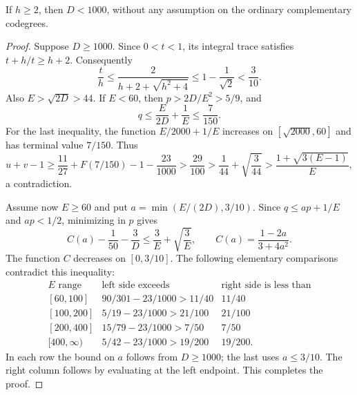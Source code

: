 \begin{lemma}\label{quad:opt:norm-ratio}
If $h\ge2$, then $D<1000$, without any assumption on the ordinary
complementary codegrees.
\end{lemma}
\begin{proof}
Suppose $D\ge1000$. Since $0<t<1$, its integral trace satisfies
$t+h/t\ge h+2$. Consequently
\[
 \frac th\le\frac2{h+2+\sqrt{h^2+4}}
 \le1-\frac1{\sqrt2}<\frac3{10}.
\]
Also $E>\sqrt{2D}>44$. If $E<60$, then
$p>2D/E^2>5/9$, and
\[
 q\le\frac E{2D}+\frac1E\le\frac7{150}.
\]
For the last inequality, the function $E/2000+1/E$ increases on
$[\sqrt{2000},60]$ and has terminal value $7/150$.
Thus
\[
 u+v-1\ge\frac{11}{27}+F(7/150)-1-\frac{23}{1000}
 >\frac{29}{100}
 >\frac1{44}+\sqrt{\frac3{44}}
 >\frac{1+\sqrt{3(E-1)}}E,
\]
a contradiction.

Assume now $E\ge60$ and put $a=\min(E/(2D),3/10)$. Since
$q\le ap+1/E$ and $ap<1/2$, minimizing in $p$ gives
\[
 C(a)-\frac1{50}-\frac3D
 \le\frac3E+\sqrt{\frac3E},\qquad
 C(a)=\frac{1-2a}{3+4a^2}.
\]
The function $C$ decreases on $[0,3/10]$. The following elementary
comparisons contradict this inequality:
\[
\begin{array}{c|c|c}
 E\text{ range}&\text{left side exceeds}&\text{right side is less than}\\\hline
 {[60,100]}&90/301-23/1000>11/40&11/40\\
 {[100,200]}&5/19-23/1000>21/100&21/100\\
 {[200,400]}&15/79-23/1000>7/50&7/50\\
 {[400,\infty)}&5/42-23/1000>19/200&19/200.
\end{array}
\]
In each row the bound on $a$ follows from $D\ge1000$; the last uses
$a\le3/10$. The right column follows by evaluating at the left
endpoint. This completes the proof.
\end{proof}

